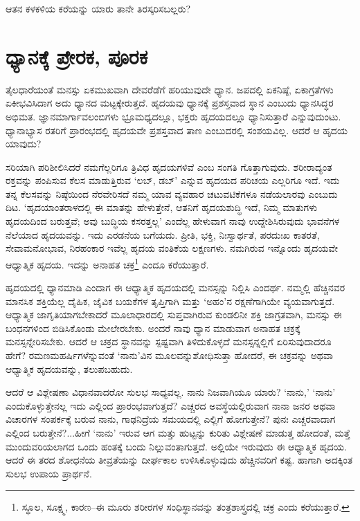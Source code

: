 ಆತನ ಕಳಕಳಿಯ ಕರೆಯನ್ನು ಯಾರು ತಾನೇ ತಿರಸ್ಕರಿಸಬಲ್ಲರು?


\section*{ಧ್ಯಾನಕ್ಕೆ ಪ್ರೇರಕ, ಪೂರಕ}


ತೈಲಧಾರೆಯಂತೆ ಮನಸ್ಸು ಏಕಮುಖವಾಗಿ ದೇವರೆಡೆಗೆ ಹರಿಯುವುದೇ ಧ್ಯಾನ. ಜಪದಲ್ಲಿ ಏಕನಿಷ್ಠೆ, ಏಕಾಗ್ರತೆಗಳು ಏಕೀಭವಿಸಿದಾಗ ಅದು ಧ್ಯಾನದ ಮಟ್ಟಕ್ಕೇರುತ್ತದೆ. ಹೃದಯವು ಧ್ಯಾನಕ್ಕೆ ಪ್ರಶಸ್ತವಾದ ಸ್ಥಾನ ಎಂಬುದು ಧ್ಯಾನಸಿದ್ಧರ ಅಭಿಮತ. ಜ್ಞಾನಮಾರ್ಗಾವಲಂಬಿಗಳು ಭ್ರೂಮಧ್ಯದಲ್ಲೂ, ಭಕ್ತರು ಹೃದಯದಲ್ಲೂ ಧ್ಯಾನಿಸುತ್ತಾರೆ ಎನ್ನುವುದುಂಟು. ಧ್ಯಾನಾಭ್ಯಾಸ ರತರಿಗೆ ಪ್ರಾರಂಭದಲ್ಲಿ ಹೃದಯವೇ ಪ್ರಶಸ್ತವಾದ ತಾಣ ಎಂಬುದರಲ್ಲಿ ಸಂಶಯವಿಲ್ಲ. ಆದರೆ ಆ ಹೃದಯ ಯಾವುದು?

ಸರಿಯಾಗಿ ಪರಿಶೀಲಿಸಿದರೆ ನಮಗೆಲ್ಲರಿಗೂ ತ್ರಿವಿಧ ಹೃದಯಗಳಿವೆ ಎಂಬ ಸಂಗತಿ ಗೊತ್ತಾಗುವುದು. ಶರೀರಾದ್ಯಂತ ರಕ್ತವನ್ನು ಪಂಪಿಸುವ ಕೆಲಸ ಮಾಡುತ್ತಿರುವ ‘ಲಬ್, ಡಬ್​’ ಎನ್ನುವ ಹೃದಯದ ಪರಿಚಯ ಎಲ್ಲರಿಗೂ ಇದೆ. ಇದು ತನ್ನ ಕೆಲಸವನ್ನು ನಿಷ್ಠೆಯಿಂದ ನೆರವೇರಿಸದೆ ನಮ್ಮ ಯಾವ ವ್ಯವಹಾರ ಚಟುವಟಿಕೆಗಳೂ ನಡೆಯಲಾರವು ಎಂಬುದು ದಿಟ. ‘ಹೃದಯಾಂತರಾಳದಲ್ಲಿ ಈ ಮಾತನ್ನು ಹೇಳುತ್ತೇನೆ, ಆತನಿಗೆ ಹೃದಯಶುದ್ಧಿ ಇದೆ, ನಿಮ್ಮ ಮಾತುಗಳು ಹೃದಯದಿಂದ ಬರುತ್ತವೆ; ಅವು ಬುದ್ಧಿಯ ಕಸರತ್ತಲ್ಲ’ ಎಂದೆಲ್ಲ ಹೇಳುವಾಗ ನಾವು ಉದ್ದೇಶಿಸಿರುವುದು ಭಾವನೆಗಳ ನೆಲೆಯಾದ ಹೃದಯವನ್ನು. ಇದು ಎರಡನೆಯ ಬಗೆಯದು. ಪ್ರೀತಿ, ಭಕ್ತಿ, ನಿಃಸ್ವಾರ್ಥತೆ, ಪರದುಃಖ ಕಾತರತೆ, ಸೇವಾಮನೋಭಾವ, ನಿರಹಂಕಾರ ಇವೆಲ್ಲ ಹೃದಯ ವಂತಿಕೆಯ ಲಕ್ಷಣಗಳು. ನಮಗಿರುವ ಇನ್ನೊಂದು ಹೃದಯವೇ ಆಧ್ಯಾತ್ಮಿಕ ಹೃದಯ. ಇದನ್ನು ಅನಾಹತ ಚಕ್ರ\footnote{ ಸ್ಥೂಲ, ಸೂಕ್ಷ್ಮ, ಕಾರಣ–ಈ ಮೂರು ಶರೀರಗಳ ಸಂಧಿಸ್ಥಾನವನ್ನು ತಂತ್ರಶಾಸ್ತ್ರದಲ್ಲಿ ಚಕ್ರ ಎಂದು ಕರೆಯುತ್ತಾರೆ.} ಎಂದೂ ಕರೆಯುತ್ತಾರೆ.

ಹೃದಯದಲ್ಲಿ ಧ್ಯಾನಮಾಡಿ ಎಂದಾಗ ಈ ಆಧ್ಯಾತ್ಮಿಕ ಹೃದಯದಲ್ಲಿ ಮನಸ್ಸನ್ನು ನಿಲ್ಲಿಸಿ ಎಂದರ್ಥ. ನಮ್ಮಲ್ಲಿ ಹೆಚ್ಚಿನವರ ಮಾನಸಿಕ ಶಕ್ತಿಯೆಲ್ಲ ದೈಹಿಕ, ಜೈವಿಕ ಬಯಕೆಗಳ ತೃಪ್ತಿಗಾಗಿ ಮತ್ತು ‘ಅಹಂ’ನ ರಕ್ಷಣೆಗಾಗಿಯೇ ವ್ಯಯವಾಗುತ್ತದೆ. ಆಧ್ಯಾತ್ಮಿಕ ಜಾಗೃತಿಯಾಗಬೇಕಾದರೆ ಮೂಲಾಧಾರದಲ್ಲಿ ಸುಪ್ತವಾಗಿರುವ ಕುಂಡಲಿನೀ ಶಕ್ತಿ ಜಾಗ್ರತವಾಗಿ, ಮನಸ್ಸು ಈ ಬಂಧನಗಳಿಂದ ಬಿಡಿಸಿಕೊಂಡು ಮೇಲೇರಬೇಕು. ಅಂದರೆ ನಾವು ಧ್ಯಾನ ಮಾಡುವಾಗ ಅನಾಹತ ಚಕ್ರಕ್ಕೆ ಮನಸ್ಸನ್ನೇರಿಸಬೇಕು. ಆದರೆ ಆ ಚಕ್ರದ ಸ್ಥಾನವನ್ನು ಸ್ಪಷ್ಟವಾಗಿ ತಿಳಿದುಕೊಳ್ಳದೆ ಮನಸ್ಸನ್ನಲ್ಲಿಗೆ ಏರಿಸುವುದಾದರೂ ಹೇಗೆ? ರಮಣಮಹರ್ಷಿಗಳೆನ್ನುವಂತೆ ‘ನಾನು’ವಿನ ಮೂಲವನ್ನು\break ಶೋಧಿಸುತ್ತಾ ಹೋದರೆ, ಈ ಚಕ್ರವನ್ನು ಅಥವಾ ಆಧ್ಯಾತ್ಮಿಕ ಹೃದಯವನ್ನು, ತಲುಪಬಹುದು.

ಆದರೆ ಆ ವಿಶ್ಲೇಷಣಾ ವಿಧಾನವಾದರೋ ಸುಲಭ ಸಾಧ್ಯವಲ್ಲ. ನಾನು ನಿಜವಾಗಿಯೂ ಯಾರು? ‘ನಾನು,’ ‘ನಾನು’ ಎಂದುಕೊಳ್ಳುತ್ತೇನಲ್ಲ ಇದು ಎಲ್ಲಿಂದ ಪ್ರಾರಂಭವಾಗುತ್ತದೆ? ಎಚ್ಚರದ ಅವಸ್ಥೆಯಲ್ಲಿರುವಾಗ ನಾನಾ ಜನರ ಅಥವಾ ವಿಚಾರಗಳ ಸಂಪರ್ಕಕ್ಕೆ ಬರುವ ನಾನು, ಗಾಢನಿದ್ರೆಯ ಸಮಯದಲ್ಲಿ ಎಲ್ಲಿಗೆ ಹೋಗುತ್ತೇನೆ? ಪುನಃ ಎಚ್ಚರವಾದಾಗ ಎಲ್ಲಿಂದ ಬರುತ್ತೇನೆ?...ಹೀಗೆ ‘ನಾನು’ ಇರುವ ಆಗ ಮತ್ತು ಹುಟ್ಟನ್ನು ಕುರಿತು ವಿಶ್ಲೇಷಣೆ ಮಾಡುತ್ತ ಹೋದಂತೆ, ಮತ್ತೆ ಮುಂದುವರಿಯಲಾಗದ ಒಂದು ಹಂತಕ್ಕೆ ಬಂದು ನಿಲ್ಲುವಂತಾಗುತ್ತದೆ. ಅಲ್ಲಿಯೇ ಇರುವುದು ಈ ಆಧ್ಯಾತ್ಮಿಕ ಹೃದಯ. ಆದರೆ ಈ ತರದ ಶೋಧನೆಯ ತೀವ್ರತೆಯನ್ನು ದೀರ್ಘಕಾಲ ಉಳಿಸಿಕೊಳ್ಳುವುದು ಹೆಚ್ಚಿನವರಿಗೆ ಕಷ್ಟ. ಹಾಗಾಗಿ ಅದಕ್ಕಿಂತ ಸುಲಭ ಉಪಾಯ ಪ್ರಾರ್ಥನೆ.

